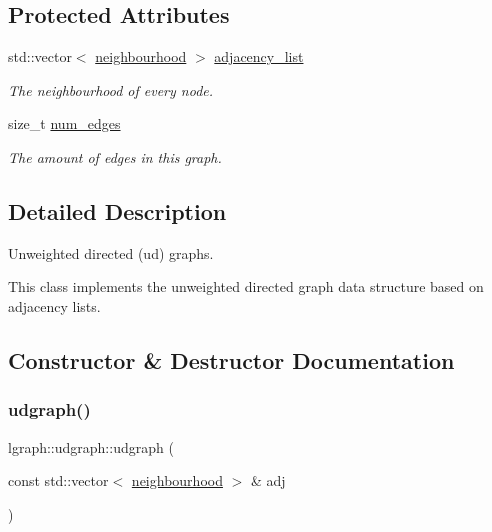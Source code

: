 \subsection*{Protected Attributes}
\begin{DoxyCompactItemize}
\item 
\mbox{\label{classlgraph_1_1xxgraph_a31cf82d0b20be05290be259dc97a51ec}} 
std\+::vector$<$ \hyperlink{namespacelgraph_a052e7766c13f3a43cec0aec8173fdede}{neighbourhood} $>$ \hyperlink{classlgraph_1_1xxgraph_a31cf82d0b20be05290be259dc97a51ec}{adjacency\+\_\+list}
\begin{DoxyCompactList}\small\item\em The neighbourhood of every node. \end{DoxyCompactList}\item 
\mbox{\label{classlgraph_1_1xxgraph_a6765a9a3be42f6e0f824635c593b35d7}} 
size\+\_\+t \hyperlink{classlgraph_1_1xxgraph_a6765a9a3be42f6e0f824635c593b35d7}{num\+\_\+edges}
\begin{DoxyCompactList}\small\item\em The amount of edges in this graph. \end{DoxyCompactList}\end{DoxyCompactItemize}


\subsection{Detailed Description}
Unweighted directed (ud) graphs. 

This class implements the unweighted directed graph data structure based on adjacency lists. 

\subsection{Constructor \& Destructor Documentation}
\mbox{\label{classlgraph_1_1udgraph_a1cb1f1872b9274c9a9253b7c6e516607}} 
\subsubsection{\texorpdfstring{udgraph()}{udgraph()}\hspace{0.1cm}{\footnotesize\ttfamily [1/2]}}
{\footnotesize\ttfamily lgraph\+::udgraph\+::udgraph (\begin{DoxyParamCaption}\item[{const std\+::vector$<$ \hyperlink{namespacelgraph_a052e7766c13f3a43cec0aec8173fdede}{neighbourhood} $>$ \&}]{adj }\end{DoxyParamCaption})}



